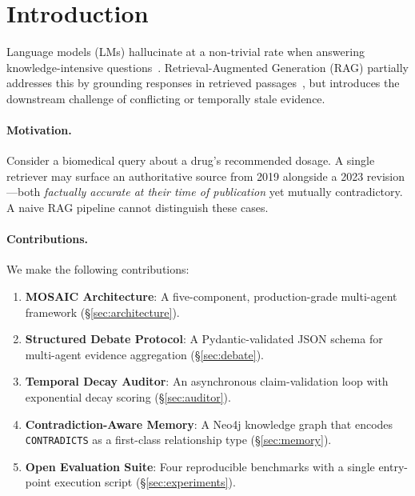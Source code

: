 \documentclass{article}
\begin{document}
\section{Introduction}
\label{sec:intro}

Language models (LMs) hallucinate at a non-trivial rate when answering
knowledge-intensive questions~\cite{maynez2020faithfulness}.  Retrieval-Augmented
Generation (RAG) partially addresses this by grounding responses in retrieved
passages~\cite{lewis2020rag}, but introduces the downstream challenge of conflicting
or temporally stale evidence.

\paragraph{Motivation.}
Consider a biomedical query about a drug's recommended dosage.  A single
retriever may surface an authoritative source from 2019 alongside a 2023
revision—both \emph{factually accurate at their time of publication} yet
mutually contradictory.  A naive RAG pipeline cannot distinguish these cases.

\paragraph{Contributions.}
We make the following contributions:
\begin{enumerate}[leftmargin=*, label=\arabic*.]
  \item \textbf{MOSAIC Architecture}: A five-component, production-grade
        multi-agent framework (\S\ref{sec:architecture}).
  \item \textbf{Structured Debate Protocol}: A Pydantic-validated JSON schema
        for multi-agent evidence aggregation (\S\ref{sec:debate}).
  \item \textbf{Temporal Decay Auditor}: An asynchronous claim-validation loop
        with exponential decay scoring (\S\ref{sec:auditor}).
  \item \textbf{Contradiction-Aware Memory}: A Neo4j knowledge graph that
        encodes \texttt{CONTRADICTS} as a first-class relationship type (\S\ref{sec:memory}).
  \item \textbf{Open Evaluation Suite}: Four reproducible benchmarks with a
        single entry-point execution script (\S\ref{sec:experiments}).
\end{enumerate}


\end{document}
